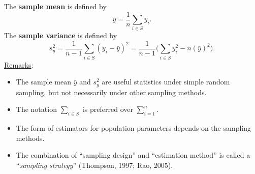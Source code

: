 \documentclass[oneside]{book}\usepackage[]{graphicx}\usepackage[svgnames]{xcolor}
\begin{document}
\begin{Regular}{}
      The \textbf{sample mean} is defined by
      \[ \bar{y}=\frac{1}{n}\sum_{i\in S}y_i. \]
      The \textbf{sample variance} is defined by
      \[ s_y^2=\frac{1}{n-1}\sum_{i\in S}(y_i-\bar{y})^2=\frac{1}{n-1}\biggl(\sum_{i\in S}y_i^2-n(\bar{y})^2\biggr). \]
      \tcblower{}
      \underline{Remarks}:
      \begin{itemize}
            \item The sample mean $ \bar{y} $ and $ s_y^2 $ are useful
                  statistics under simple random sampling, but not necessarily under
                  other sampling methods.
            \item The notation $ \sum_{i\in S} $ is preferred over
                  $ \sum_{i=1}^{n} $.
            \item The form of estimators for population parameters depends on the
                  sampling methods.
            \item The combination of ``sampling design'' and ``estimation method''
                  is called a ``\emph{sampling strategy}'' (Thompson, 1997; Rao, 2005).
      \end{itemize}
\end{Regular}
\end{document}

